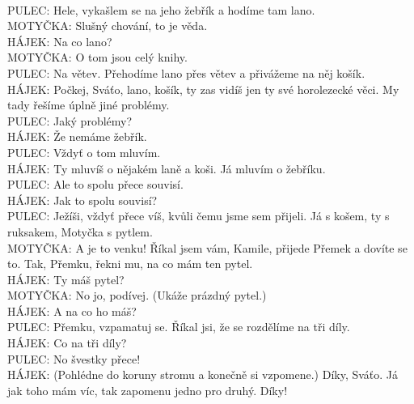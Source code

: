 \documentclass[11pt]{article}
\begin{document}
    \\PULEC: Hele, vykašlem se na jeho žebřík a hodíme tam lano.
    \\MOTYČKA: Slušný chování, to je věda.
    \\HÁJEK: Na co lano?
    \\MOTYČKA: O tom jsou celý knihy.
    \\PULEC: Na větev. Přehodíme lano přes větev a přivážeme na něj košík.
    \\HÁJEK: Počkej, Sváťo, lano, košík, ty zas vidíš jen ty své horolezecké věci. My tady řešíme úplně jiné problémy.
    \\PULEC: Jaký problémy?
    \\HÁJEK: Že nemáme žebřík.
    \\PULEC: Vždyť o tom mluvím.
    \\HÁJEK: Ty mluvíš o nějakém laně a koši. Já mluvím o žebříku.
    \\PULEC: Ale to spolu přece souvisí.
    \\HÁJEK: Jak to spolu souvisí?
    \\PULEC: Ježíši, vždyť přece víš, kvůli čemu jsme sem přijeli. Já s košem, ty s ruksakem, Motyčka s pytlem.
    \\MOTYČKA: A je to venku! Říkal jsem vám, Kamile, přijede Přemek a dovíte se to. Tak, Přemku, řekni mu, na co mám ten pytel.
    \\HÁJEK: Ty máš pytel?
    \\MOTYČKA: No jo, podívej. (Ukáže prázdný pytel.)
    \\HÁJEK: A na co ho máš?
    \\PULEC: Přemku, vzpamatuj se. Říkal jsi, že se rozdělíme na tři díly.
    \\HÁJEK: Co na tři díly?
    \\PULEC: No švestky přece!
    \\HÁJEK: (Pohlédne do koruny stromu a konečně si vzpomene.) Díky, Sváťo. Já jak toho mám víc, tak zapomenu jedno pro druhý. Díky!
\end{document}
